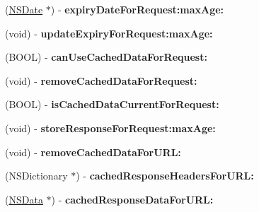 \begin{DoxyCompactItemize}
\item 
\hypertarget{protocol_a_s_i_cache_delegate-p_a36d0b83c9017dba94a93acc3cae9aa65}{
(\hyperlink{class_n_s_date}{\-N\-S\-Date} $\ast$) -\/ {\bfseries expiry\-Date\-For\-Request\-:max\-Age\-:}}
\label{protocol_a_s_i_cache_delegate-p_a36d0b83c9017dba94a93acc3cae9aa65}

\item 
\hypertarget{protocol_a_s_i_cache_delegate-p_ad793f424847f6f7a2c5154fb8cec1bb6}{
(void) -\/ {\bfseries update\-Expiry\-For\-Request\-:max\-Age\-:}}
\label{protocol_a_s_i_cache_delegate-p_ad793f424847f6f7a2c5154fb8cec1bb6}

\item 
\hypertarget{protocol_a_s_i_cache_delegate-p_a7cf0deb09983a6b552fd7a2130529c95}{
(\-B\-O\-O\-L) -\/ {\bfseries can\-Use\-Cached\-Data\-For\-Request\-:}}
\label{protocol_a_s_i_cache_delegate-p_a7cf0deb09983a6b552fd7a2130529c95}

\item 
\hypertarget{protocol_a_s_i_cache_delegate-p_a2e34141ed1db825ca2d1c292b068193e}{
(void) -\/ {\bfseries remove\-Cached\-Data\-For\-Request\-:}}
\label{protocol_a_s_i_cache_delegate-p_a2e34141ed1db825ca2d1c292b068193e}

\item 
\hypertarget{protocol_a_s_i_cache_delegate-p_a67c31b3473af7adba4cd548045935ac2}{
(\-B\-O\-O\-L) -\/ {\bfseries is\-Cached\-Data\-Current\-For\-Request\-:}}
\label{protocol_a_s_i_cache_delegate-p_a67c31b3473af7adba4cd548045935ac2}

\item 
\hypertarget{protocol_a_s_i_cache_delegate-p_ae7cfacf47d3d24e151530c033f993734}{
(void) -\/ {\bfseries store\-Response\-For\-Request\-:max\-Age\-:}}
\label{protocol_a_s_i_cache_delegate-p_ae7cfacf47d3d24e151530c033f993734}

\item 
\hypertarget{protocol_a_s_i_cache_delegate-p_aa2d162430d8c9bc47057030b3e305f18}{
(void) -\/ {\bfseries remove\-Cached\-Data\-For\-U\-R\-L\-:}}
\label{protocol_a_s_i_cache_delegate-p_aa2d162430d8c9bc47057030b3e305f18}

\item 
\hypertarget{protocol_a_s_i_cache_delegate-p_ab7b267fc153dcf624c91e2d07513f868}{
(\-N\-S\-Dictionary $\ast$) -\/ {\bfseries cached\-Response\-Headers\-For\-U\-R\-L\-:}}
\label{protocol_a_s_i_cache_delegate-p_ab7b267fc153dcf624c91e2d07513f868}

\item 
\hypertarget{protocol_a_s_i_cache_delegate-p_a24c0d2a6834e5a0332f3d95198fc681c}{
(\hyperlink{class_n_s_data}{\-N\-S\-Data} $\ast$) -\/ {\bfseries cached\-Response\-Data\-For\-U\-R\-L\-:}}
\label{protocol_a_s_i_cache_delegate-p_a24c0d2a6834e5a0332f3d95198fc681c}


\end{DoxyCompactItemize}
